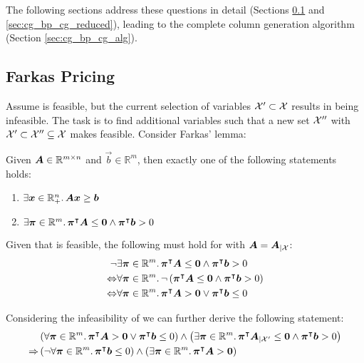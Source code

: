 The following sections address these questions in detail (Sections \ref{sec:cg_bp_cg_farkas} and \ref{sec:cg_bp_cg_reduced}), leading to the complete column generation algorithm (Section \ref{sec:cg_bp_cg_alg}).

\subsection{Farkas Pricing \FP{}}\label{sec:cg_bp_cg_farkas}
Assume \MP{} is feasible, but the current selection of variables $\mathcal{X}' \subset \mathcal{X}$ results in \RMP{} being infeasible. The task is to find additional variables such that a new set $\mathcal{X}''$ with $\mathcal{X}' \subset \mathcal{X}'' \subseteq \mathcal{X}$ makes \RMP{} feasible. Consider Farkas' lemma:

\begin{theorem}\label{th:farkas_lemma}
Given ${\bm{A}} \in \mathbb{R}^{m \times n}$ and $\vec{b} \in \mathbb{R}^m$, then exactly one of the following statements holds:
\begin{enumerate}
	\item $\exists {\bm{x}} \in \mathbb{R}_+^n. \, {\bm{A}} {\bm{x}} \geq {\bm{b}}$
	\item $\exists {\bm{\pi}} \in \mathbb{R}^m. \, {\bm{\pi}}^\intercal {\bm{A}} \leq {\bm{0}} \land {\bm{\pi}}^\intercal {\bm{b}} > 0$
\end{enumerate}
\end{theorem}

Given that \MP{} is feasible, the following must hold for \MP{} with ${\bm{A}} = {\bm{A}}_{\vert \mathcal{X}}$:
\begin{equation}
\begin{aligned}
\neg & \exists {\bm{\pi}} \in \mathbb{R}^m. \, {\bm{\pi}}^\intercal {\bm{A}} \leq {\bm{0}} \land {\bm{\pi}}^\intercal {\bm{b}} > 0 \\
\Leftrightarrow & \forall {\bm{\pi}} \in \mathbb{R}^m. \, \neg \left( {\bm{\pi}}^\intercal {\bm{A}} \leq {\bm{0}} \land {\bm{\pi}}^\intercal {\bm{b}} > 0 \right)\\
\Leftrightarrow & \forall {\bm{\pi}} \in \mathbb{R}^m. \, {\bm{\pi}}^\intercal {\bm{A}} > {\bm{0}} \lor {\bm{\pi}}^\intercal {\bm{b}} \leq 0
\end{aligned}
\end{equation}

Considering the infeasibility of \RMP{} we can further derive the following statement:
\begin{equation}
\begin{aligned}
& \left( \forall {\bm{\pi}} \in \mathbb{R}^m. \, {\bm{\pi}}^\intercal {\bm{A}} > {\bm{0}} \lor {\bm{\pi}}^\intercal {\bm{b}} \leq 0 \right) \land \left( \exists {\bm{\pi}} \in \mathbb{R}^m. \, {\bm{\pi}}^\intercal {\bm{A}}_{\vert \mathcal{X}'} \leq {\bm{0}} \land {\bm{\pi}}^\intercal {\bm{b}} > 0 \right) \\
\Rightarrow & \left( \neg \forall {\bm{\pi}} \in \mathbb{R}^m. \, {\bm{\pi}}^\intercal {\bm{b}} \leq 0 \right) \land \left( \exists {\bm{\pi}} \in \mathbb{R}^m. \, {\bm{\pi}}^\intercal {\bm{A}} > {\bm{0}} \right)
\end{aligned}
\end{equation}

